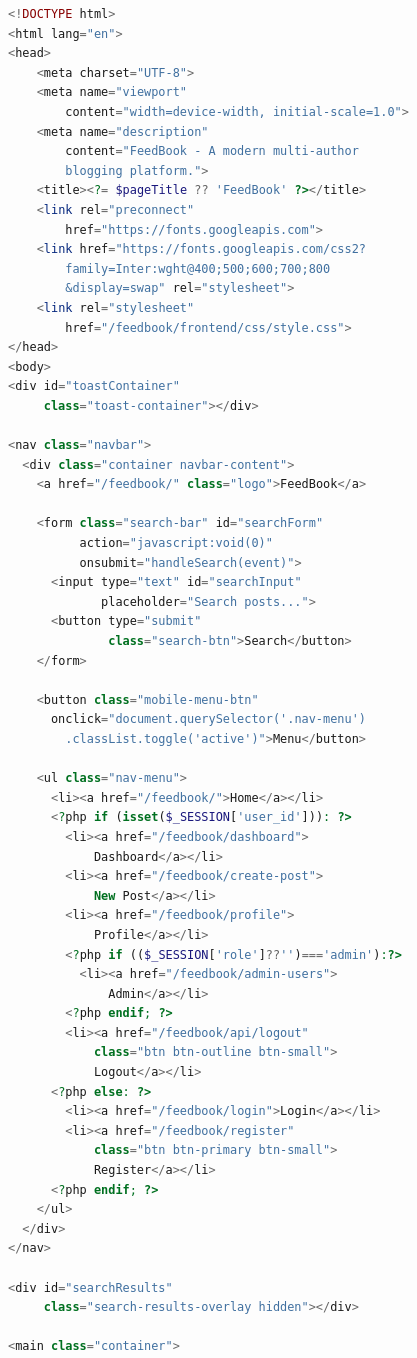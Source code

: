 \documentclass[12pt,a4paper]{report}
\begin{document}
\begin{lstlisting}[language=PHP]
<!DOCTYPE html>
<html lang="en">
<head>
    <meta charset="UTF-8">
    <meta name="viewport"
        content="width=device-width, initial-scale=1.0">
    <meta name="description"
        content="FeedBook - A modern multi-author
        blogging platform.">
    <title><?= $pageTitle ?? 'FeedBook' ?></title>
    <link rel="preconnect"
        href="https://fonts.googleapis.com">
    <link href="https://fonts.googleapis.com/css2?
        family=Inter:wght@400;500;600;700;800
        &display=swap" rel="stylesheet">
    <link rel="stylesheet"
        href="/feedbook/frontend/css/style.css">
</head>
<body>
<div id="toastContainer"
     class="toast-container"></div>

<nav class="navbar">
  <div class="container navbar-content">
    <a href="/feedbook/" class="logo">FeedBook</a>

    <form class="search-bar" id="searchForm"
          action="javascript:void(0)"
          onsubmit="handleSearch(event)">
      <input type="text" id="searchInput"
             placeholder="Search posts...">
      <button type="submit"
              class="search-btn">Search</button>
    </form>

    <button class="mobile-menu-btn"
      onclick="document.querySelector('.nav-menu')
        .classList.toggle('active')">Menu</button>

    <ul class="nav-menu">
      <li><a href="/feedbook/">Home</a></li>
      <?php if (isset($_SESSION['user_id'])): ?>
        <li><a href="/feedbook/dashboard">
            Dashboard</a></li>
        <li><a href="/feedbook/create-post">
            New Post</a></li>
        <li><a href="/feedbook/profile">
            Profile</a></li>
        <?php if (($_SESSION['role']??'')==='admin'):?>
          <li><a href="/feedbook/admin-users">
              Admin</a></li>
        <?php endif; ?>
        <li><a href="/feedbook/api/logout"
            class="btn btn-outline btn-small">
            Logout</a></li>
      <?php else: ?>
        <li><a href="/feedbook/login">Login</a></li>
        <li><a href="/feedbook/register"
            class="btn btn-primary btn-small">
            Register</a></li>
      <?php endif; ?>
    </ul>
  </div>
</nav>

<div id="searchResults"
     class="search-results-overlay hidden"></div>

<main class="container">
\end{lstlisting}
\end{document}
